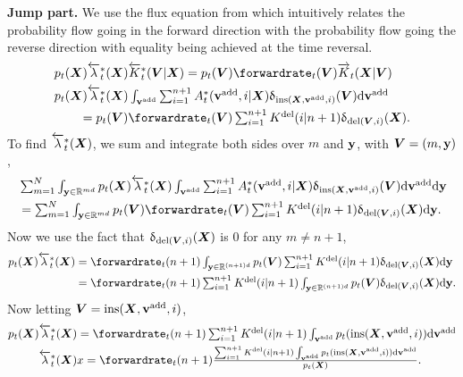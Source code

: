 \textbf{Jump part.}
We use the flux equation from \citet{conforti2022time} which intuitively relates the probability flow going in the forward direction with the probability flow going the reverse direction with equality being achieved at the time reversal.
\begin{align}
  &p_t(\mX) \backwardrate_t^*(\mX) \btk_t^*(\mV | \mX) = p_t(\mV) \forwardrate_t(\mV) \ftk_t(\mX | \mV)\\
  &\textstyle p_t(\mX) \backwardrate_t^*(\mX) \int_{\yadd} \sum_{i=1}^{n+1} \autonet_t^*(\yadd, i | \mX) \updelta_{\text{ins}(\mX, \yadd, i)}(\mV) \rmd \yadd \\
  & \qquad = \textstyle p_t(\mV) \forwardrate_t(\mV) \sum_{i=1}^{n+1} \delidxdist(i | n+1) \updelta_{\text{del}(\mV, i)}(\mX) . \label{eq:probflowfull}
\end{align}
To find $\overleftarrow{\lambda}_t^*({\bm{X}})$, we sum and integrate both sides over $m$ and $\mathbf{y}$, with ${\bm{V}} = (m, \mathbf{y})$,
\begin{align}
    &\textstyle \sum_{m=1}^N \int_{\y \in \mathbb{R}^{md}} p_t(\mX) \backwardrate_t^*(\mX) \int_{\yadd} \sum_{i=1}^{n+1} \autonet_t^*(\yadd, i | \mX) \updelta_{\text{ins}(\mX, \yadd, i)}(\mV) \rmd \yadd \rmd \y \\
    &\textstyle = \sum_{m=1}^N \int_{\y \in \mathbb{R}^{md}} p_t(\mV) \forwardrate_t(\mV) \sum_{i=1}^{n+1} \delidxdist(i | n+1) \updelta_{\text{del}(\mV, i)}(\mX) \rmd \y.
\end{align}
Now we use the fact that $\updelta_{\text{del}({\bm{V}}, i)}({\bm{X}})$ is $0$ for any $m \neq n+1$,
\begin{align}
    p_t(\mX) \backwardrate_t^*(\mX) &\textstyle = \forwardrate_t(n+1) \int_{\y \in \mathbb{R}^{(n+1)d}} p_t(\mV) \sum_{i=1}^{n+1} \delidxdist(i | n+1) \updelta_{\text{del}(\mV, i)} (\mX) \rmd \y\\
    &\textstyle = \forwardrate_t(n+1) \sum_{i=1}^{n+1} \delidxdist(i | n+1) \int_{\y \in \mathbb{R}^{(n+1)d}} p_t(\mV)  \updelta_{\text{del}(\mV, i)} (\mX) \rmd \y.
\end{align}
Now letting ${\bm{V}} = \text{ins}({\bm{X}}, {\mathbf{v}}^{\textup{add}}, i)$,
\begin{align}
    p_t(\mX) \backwardrate_t^*(\mX) &\textstyle = \forwardrate_t(n+1) \sum_{i=1}^{n+1} \delidxdist(i | n+1) \int_{\yadd} p_t(\text{ins}(\mX, \yadd, i)) \rmd \yadd\\
    \backwardrate_t^*(\mX) &\textstyle x= \forwardrate_t(n+1) \frac{\sum_{i=1}^{n+1} \delidxdist(i | n+1) \int_{\yadd} p_t(\text{ins}(\mX, \yadd, i)) \rmd \yadd}{p_t(\mX)}.
\end{align}
